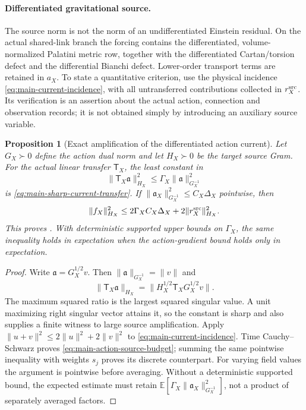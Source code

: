 \documentclass[11pt]{article}
\newtheorem{proposition}[proposition]{Proposition}
\theoremstyle{definition}
\theoremstyle{remark}
\begin{document}
\paragraph{Differentiated gravitational source.}
The source norm is not the norm of an undifferentiated Einstein residual.
On the actual shared-link branch the forcing contains the differentiated,
volume-normalized Palatini metric row, together with the differentiated
Cartan/torsion defect and the differential Bianchi defect.  Lower-order
transport terms are retained in $a_X$.  To state a quantitative criterion,
use the physical incidence \eqref{eq:main-current-incidence}, with all
untransferred contributions collected in $r_X^{\rm src}$.  Its verification
is an assertion about the actual action, connection and observation records;
it is not obtained simply by introducing an auxiliary source variable.

\begin{proposition}[Exact amplification of the differentiated action current]
\label{prop:supp-sharp-current-transfer}
Let $G_X\succ0$ define the action dual norm and let $H_X\succ0$ be the target
source Gram.  For the actual linear transfer $\mathsf T_X$, the least constant
in
\[
 \|\mathsf T_X\mathfrak a\|_{H_X}^2
       \le\Gamma_X\|\mathfrak a\|_{G_X^{-1}}^2
\]
is \eqref{eq:main-sharp-current-transfer}.  If
$\|\mathfrak a_X\|_{G_X^{-1}}^2\le C_X\Delta_X$ pointwise, then
\begin{equation}
 \|f_X\|_{H_X}^2
       \le2\Gamma_XC_X\Delta_X+2\|r_X^{\rm src}\|_{H_X}^2.
 \label{eq:supp-curvature-source-budget}
\end{equation}
This proves .  With deterministic supported
upper bounds on $\Gamma_X$, the same inequality holds in expectation when
the action-gradient bound holds only in expectation.
\end{proposition}
\begin{proof}
Write $\mathfrak a=G_X^{1/2}v$.  Then
$\|\mathfrak a\|_{G_X^{-1}}=\|v\|$ and
\[
 \|\mathsf T_X\mathfrak a\|_{H_X}
       =\|H_X^{1/2}\mathsf T_XG_X^{1/2}v\|.
\]
The maximum squared ratio is the largest squared singular value.  A unit
maximizing right singular vector attains it, so the constant is sharp and
also supplies a finite witness to large source amplification.
Apply $\|u+v\|^2\le2\|u\|^2+2\|v\|^2$ to
\eqref{eq:main-current-incidence}.  Time Cauchy--Schwarz proves
\eqref{eq:main-action-source-budget}; summing the same pointwise inequality
with weights $s_j$ proves its discrete counterpart.  For varying field
values the argument is pointwise before averaging.  Without a deterministic
supported bound, the expected estimate must retain
$\mathbb E[\Gamma_X\|\mathfrak a_X\|_{G_X^{-1}}^2]$, not a product of
separately averaged factors.
\end{proof}
\end{document}
